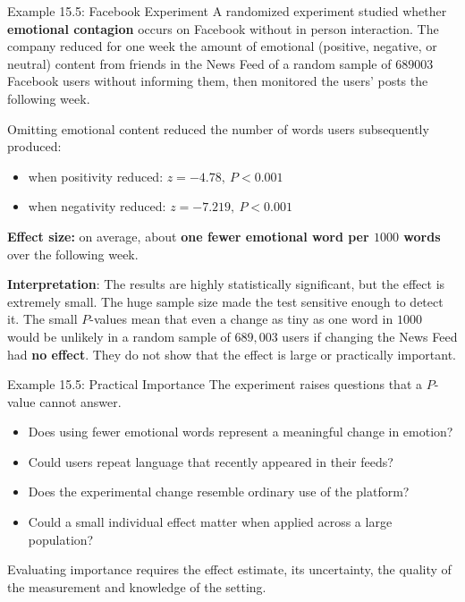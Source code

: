 \documentclass[aspectratio=169]{beamer}
\begin{document}
\begin{frame}{Example 15.5: Facebook Experiment}
A randomized experiment studied whether \textbf{emotional contagion} occurs on Facebook without in person interaction. The company reduced for one week the amount of emotional (positive, negative, or neutral) content from friends in the News Feed of a random sample of $689003$ Facebook users without informing them, then monitored the users’ posts the following week.

\vspace{0.2cm}
Omitting emotional content reduced the number of words users subsequently produced:
\begin{itemize}
  \item when positivity reduced: $z=-4.78,\ P<0.001$
  \item when negativity reduced: $z=-7.219,\ P<0.001$
\end{itemize}

\vspace{0.1cm}
\textbf{Effect size:} on average, about \textbf{one fewer emotional word per $1000$ words} over the following week.

\textbf{Interpretation}: The results are highly statistically significant, but the effect is extremely small. The huge sample size made the test sensitive enough to detect it. The small $P$-values mean that even a change as tiny as one word in $1000$ would be unlikely in a random sample of $689{,}003$ users if changing the News Feed had \textbf{no effect}. They do not show that the effect is large or practically important.

\end{frame}

\begin{frame}{Example 15.5: Practical Importance}
The experiment raises questions that a $P$-value cannot answer.
\begin{itemize}
  \item Does using fewer emotional words represent a meaningful change in emotion?
  \item Could users repeat language that recently appeared in their feeds?
  \item Does the experimental change resemble ordinary use of the platform?
  \item Could a small individual effect matter when applied across a large population?
\end{itemize}

\vspace{0.2cm}
Evaluating importance requires the effect estimate, its uncertainty, the quality of the measurement and knowledge of the setting.
\end{frame}
\end{document}
